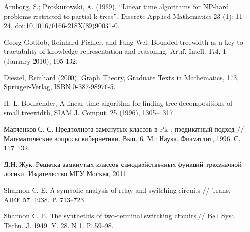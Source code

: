 \documentclass[12pt]{article}
\begin{document}
 Arnborg, S.; Proskurowski, A. (1989), 
``Linear time algorithms for NP-hard problems restricted to partial k-trees'',
Discrete Applied Mathematics 23 (1): 11–24, doi:10.1016/0166-218X(89)90031-0.

Georg Gottlob, Reinhard Pichler, and Fang Wei, 
Bounded treewidth as a key to tractability of knowledge representation and reasoning. 
Artif. Intell. 174, 1 (January 2010), 105-132. 

Diestel, Reinhard (2000), Graph Theory, Graduate Texts in Mathematics, 
173, Springer-Verlag, ISBN 0-387-98976-5.

H. L. Bodlaender, A linear-time algorithm for finding 
tree-decompositions of small
treewidth, SIAM J. Comput. 25 (1996), 1305–1317

Марченков С. С. Предполнота замкнутых классов в Pk : предикатный
подход // Математические вопросы кибернетики. Вып. 6. М.: Наука.
Физматлит, 1996. С. 117–132.

Д.Н. Жук. Решетка замкнутых классов самодвойственных функций трехзначной логики. Издательство МГУ Москва, 2011

Shannon C. E. A symbolic analysis of relay and switching circuits // Trans.
AIEE 57. 1938. P. 713–723.

Shannon C. E. The synthethis of two-terminal switching circuits // Bell
Syst. Techn. J. 1949. V. 28. N 1. P. 59–98.

\endthebibliography
\end{document}
